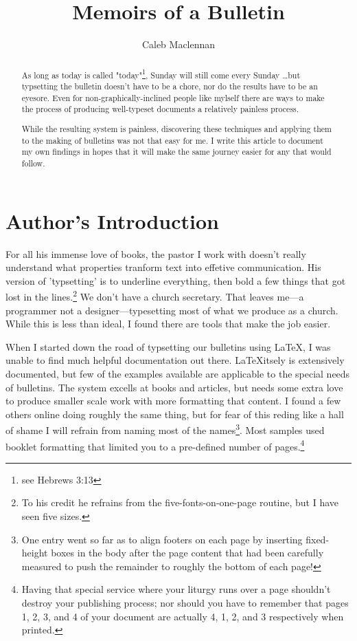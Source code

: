 \documentclass[12pt,a4paper,twoside]{article} %
\begin{document}
\title{Memoirs of a Bulletin}
\author{Caleb Maclennan}

\maketitle

\begin{abstract}
As long as today is called "today"\footnote{see Hebrews 3:13}, Sunday will still come every Sunday \dots but typsetting the bulletin doesn't have to be a chore, nor do the results have to be an eyesore. Even for non-graphically-inclined people like mylself there are ways to make the process of producing well-typeset documents a relatively painless process.

While the resulting system is painless, discovering these techniques and applying them to the making of bulletins was not that easy for me. I write this article to document my own findings in hopes that it will make the same journey easier for any that would follow.
\end{abstract}

\thispagestyle{empty}

\section*{Author's Introduction}

For all his immense love of books, the pastor I work with doesn't really understand what properties tranform text into effetive communication. His version of 'typsetting' is to underline everything, then bold a few things that got lost in the lines.\footnote{To his credit he refrains from the five-fonts-on-one-page routine, but I have seen five sizes.} We don't have a church secretary. That leaves me---a programmer not a designer---typesetting most of what we produce as a church. While this is less than ideal, I found there are tools that make the job easier.

When I started down the road of typsetting our bulletins using \LaTeX, I was unable to find much helpful documentation out there. \LaTeX itsely is extensively documented, but few of the examples available are applicable to the special needs of bulletins. The system excells at books and articles, but needs some extra love to produce smaller scale work with more formatting that content. I found a few others online doing roughly the same thing, but for fear of this reding like a hall of shame I will refrain from naming most of the names\footnote{One entry went so far as to align footers on each page by inserting fixed-height boxes in the body after the page content that had been carefully measured to push the remainder to roughly the bottom of each page!}. Most samples used booklet formatting that limited you to a pre-defined number of pages.\footnote{Having that special service where your liturgy runs over a page shouldn't destroy your publishing process; nor should you have to remember that pages 1, 2, 3, and 4 of your document are actually 4, 1, 2, and 3 respectively when printed.}
\end{document}
